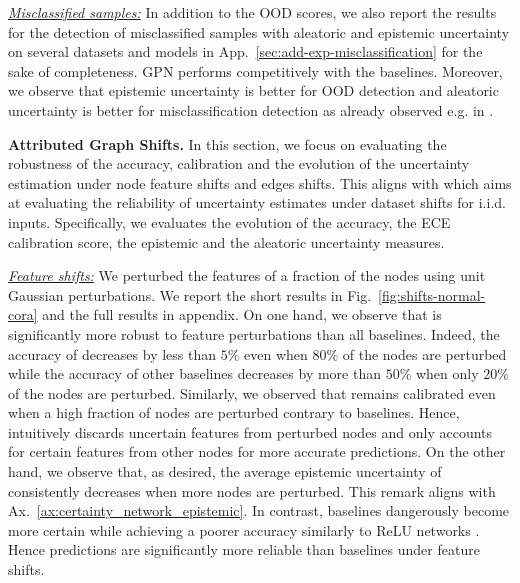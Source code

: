 \textit{\underline{Misclassified samples:}} In addition to the OOD scores, we also report the results for the detection of misclassified samples with aleatoric and epistemic uncertainty on several datasets and models in App.~\ref{sec:add-exp-misclassification} for the sake of completeness. GPN performs competitively with the baselines. Moreover, we observe that epistemic uncertainty is better for OOD detection and aleatoric uncertainty is better for misclassification detection as already observed  e.g. in \citep{Zhao2020}.




\textbf{Attributed Graph Shifts.} In this section, we focus on evaluating the robustness of the accuracy, calibration and the evolution of the uncertainty estimation under node feature shifts and edges shifts. This aligns with \citep{Ovadia2019} which aims at evaluating the reliability of uncertainty estimates under dataset shifts for i.i.d. inputs. Specifically, we evaluates the evolution of the accuracy, the ECE \citep{Naeini2015} calibration score, the epistemic and the aleatoric uncertainty measures. 


\textit{\underline{Feature shifts:}} We perturbed the features of a fraction of the nodes using unit Gaussian perturbations. We report the short results in Fig.~\ref{fig:shifts-normal-cora} and the full results in appendix. On one hand, we observe that \oursacro{} is significantly more robust to feature perturbations than all baselines. Indeed, the accuracy of \oursacro{} decreases by less than $5\%$ even when $80\%$ of the nodes are perturbed while the accuracy of other baselines decreases by more than $50\%$ when only $20\%$ of the nodes are perturbed. Similarly, we observed that \oursacro{} remains calibrated even when a high fraction of nodes are perturbed contrary to baselines. Hence, \oursacro{} intuitively discards uncertain features from perturbed nodes and only accounts for certain features from other nodes for more accurate predictions. On the other hand, we observe that, as desired, the average epistemic uncertainty of \oursacro{} consistently decreases when more nodes are perturbed. This remark aligns with Ax.~\ref{ax:certainty_network_epistemic}. In contrast, baselines dangerously become more certain while achieving a poorer accuracy similarly to ReLU networks \citep{overconfident-relu}. Hence \oursacro{} predictions are significantly more reliable than baselines under feature shifts. 


